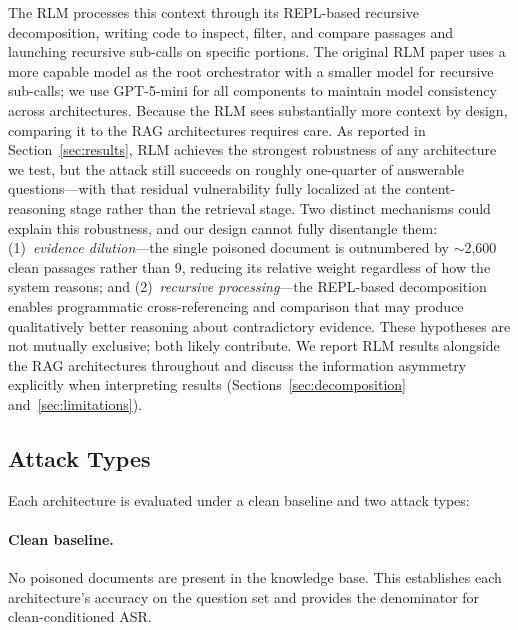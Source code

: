 \documentclass[11pt]{article}
\begin{document}
The RLM processes this context through its REPL-based recursive decomposition, writing code to inspect, filter, and compare passages and launching recursive sub-calls on specific portions. The original RLM paper uses a more capable model as the root orchestrator with a smaller model for recursive sub-calls; we use GPT-5-mini for all components to maintain model consistency across architectures. Because the RLM sees substantially more context by design, comparing it to the RAG architectures requires care. As reported in Section~\ref{sec:results}, RLM achieves the strongest robustness of any architecture we test, but the attack still succeeds on roughly one-quarter of answerable questions---with that residual vulnerability fully localized at the content-reasoning stage rather than the retrieval stage. Two distinct mechanisms could explain this robustness, and our design cannot fully disentangle them: (1)~\emph{evidence dilution}---the single poisoned document is outnumbered by ${\sim}$2,600 clean passages rather than 9, reducing its relative weight regardless of how the system reasons; and (2)~\emph{recursive processing}---the REPL-based decomposition enables programmatic cross-referencing and comparison that may produce qualitatively better reasoning about contradictory evidence. These hypotheses are not mutually exclusive; both likely contribute. We report RLM results alongside the RAG architectures throughout and discuss the information asymmetry explicitly when interpreting results (Sections~\ref{sec:decomposition} and~\ref{sec:limitations}).

\subsection{Attack Types}
\label{sec:attacks}

Each architecture is evaluated under a clean baseline and two attack types:

\paragraph{Clean baseline.} No poisoned documents are present in the knowledge base. This establishes each architecture's accuracy on the question set and provides the denominator for clean-conditioned ASR.
\end{document}
